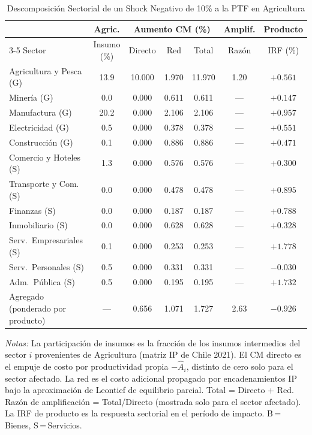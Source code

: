 \begin{table}[htbp]
\centering
\caption{Descomposición Sectorial de un Shock Negativo de 10\% a la PTF en Agricultura}
\label{tab:agr_decomp}
\begin{threeparttable}
\small
\begin{tabular}{@{}l c c c c c c@{}}
\toprule
 & Agric. & \multicolumn{3}{c}{Aumento CM (\%)} & Amplif. & Producto \\
\cmidrule(lr){3-5}
Sector & Insumo (\%) & Directo & Red & Total & Razón & IRF (\%) \\
\midrule
Agricultura y Pesca (G) & 13.9 & 10.000 & 1.970 & 11.970 &  1.20 & $+0.561$ \\
Minería (G) &  0.0 & 0.000 & 0.611 & 0.611 & --- & $+0.147$ \\
Manufactura (G) & 20.2 & 0.000 & 2.106 & 2.106 & --- & $+0.957$ \\
Electricidad (G) &  0.5 & 0.000 & 0.378 & 0.378 & --- & $+0.551$ \\
Construcción (G) &  0.1 & 0.000 & 0.886 & 0.886 & --- & $+0.471$ \\
Comercio y Hoteles (S) &  1.3 & 0.000 & 0.576 & 0.576 & --- & $+0.300$ \\
Transporte y Com. (S) &  0.0 & 0.000 & 0.478 & 0.478 & --- & $+0.895$ \\
Finanzas (S) &  0.0 & 0.000 & 0.187 & 0.187 & --- & $+0.788$ \\
Inmobiliario (S) &  0.0 & 0.000 & 0.628 & 0.628 & --- & $+0.328$ \\
Serv.\ Empresariales (S) &  0.1 & 0.000 & 0.253 & 0.253 & --- & $+1.778$ \\
Serv.\ Personales (S) &  0.5 & 0.000 & 0.331 & 0.331 & --- & $-0.030$ \\
Adm.\ Pública (S) &  0.5 & 0.000 & 0.195 & 0.195 & --- & $+1.732$ \\
\midrule
Agregado (ponderado por producto) & --- & 0.656 & 1.071 & 1.727 &  2.63 & $-0.926$ \\
\bottomrule
\end{tabular}
\begin{tablenotes}[flushleft]
\footnotesize
\item \textit{Notas:} La participación de insumos es la fracción de los insumos intermedios del sector $i$ provenientes de Agricultura (matriz IP de Chile 2021). El CM directo es el empuje de costo por productividad propia $-\hat A_i$, distinto de cero solo para el sector afectado. La red es el costo adicional propagado por encadenamientos IP bajo la aproximación de Leontief de equilibrio parcial. Total = Directo + Red. Razón de amplificación = Total/Directo (mostrada solo para el sector afectado). La IRF de producto es la respuesta sectorial en el período de impacto. B\,=\,Bienes, S\,=\,Servicios.
\end{tablenotes}
\end{threeparttable}
\end{table}
